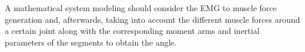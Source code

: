 \documentclass[letterpaper, 10 pt, conference]{ieeeconf}  %
\begin{document}




A mathematical system modeling should consider the EMG to muscle force generation and, afterwards, taking into account the different muscle forces around a certain joint along with the corresponding moment arms and inertial parameters of the segments to obtain the angle.
\end{document}

